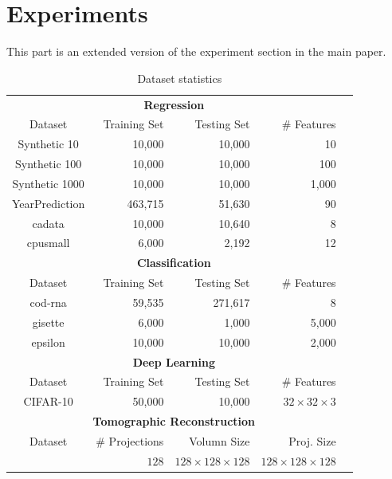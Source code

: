 \documentclass{article}
\begin{document}
\section{Experiments}

This part is an extended version of the experiment section in the main paper.

\begin{table}[t]
\small
\centering
\begin{tabular}{crrrr}
\hline
\multicolumn{4}{c}{\bf Regression}\\
Dataset           & Training Set & Testing Set & \# Features  \\
\hline
Synthetic 10   & 10,000        & 10,000       & 10               \\
Synthetic 100  & 10,000        & 10,000       & 100              \\
Synthetic 1000 & 10,000        & 10,000       & 1,000           \\
YearPrediction & 463,715       & 51,630       & 90                  \\
cadata         & 10,000        & 10,640       & 8                   \\
cpusmall       & 6,000         & 2,192        & 12     \\
\hline
\hline
\multicolumn{4}{c}{\bf Classification}\\
Dataset           & Training Set & Testing Set & \# Features \\
\hline
cod-rna        & 59,535        & 271,617      & 8    \\
gisette        & 6,000         & 1,000        & 5,000  \\  
epsilon        & 10,000        & 10,000       & 2,000\\  
\hline
\hline
\multicolumn{4}{c}{\bf Deep Learning}\\
Dataset           & Training Set & Testing Set & \# Features \\
\hline
CIFAR-10        & 50,000        & 10,000      &$32\times 32\times 3$     \\
\hline
\hline
\multicolumn{4}{c}{\bf Tomographic Reconstruction}\\
Dataset           & \# Projections & Volumn Size & Proj. Size \\
\hline
                  & $128$            & $128\times 128\times 128$      & $128\times 128\times 128$     \\
\hline
\end{tabular}
\caption{Dataset statistics}
\label{table:dataset}
\end{table}
\end{document}
